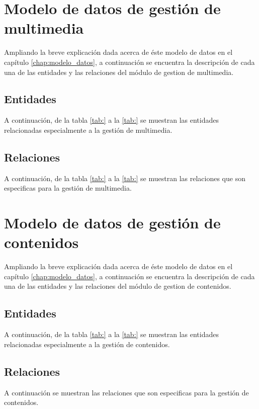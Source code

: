 \section{Modelo de datos de gestión de multimedia}
Ampliando la breve explicación dada acerca de éste modelo de datos en el capítulo \ref{chap:modelo_datos}, a continuación se encuentra la descripción de cada una de las entidades y las relaciones del módulo de gestion de multimedia.
\subsection{Entidades}
A continuación, de la tabla \ref{tab:} a la \ref{tab:} se muestran las entidades relacionadas especialmente a la gestión de multimedia.





\subsection{Relaciones}
A continuación, de la tabla \ref{tab:} a la \ref{tab:} se muestran las relaciones que son especificas para la gestión de multimedia.






\section{Modelo de datos de gestión de contenidos}
Ampliando la breve explicación dada acerca de éste modelo de datos en el capítulo \ref{chap:modelo_datos}, a continuación se encuentra la descripción de cada una de las entidades y las relaciones del módulo de gestion de contenidos.
\subsection{Entidades}
A continuación, de la tabla \ref{tab:} a la \ref{tab:} se muestran las entidades relacionadas especialmente a la gestión de contenidos.

\subsection{Relaciones}
A continuación se muestran las relaciones que son especificas para la gestión de contenidos.


